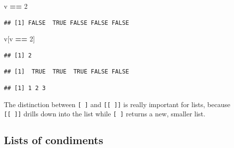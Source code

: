 \documentclass[
]{book}
\newenvironment{Shaded}{\begin{snugshade}}{\end{snugshade}}
\newcommand{\DecValTok}[1]{\textcolor[rgb]{0.00,0.00,0.81}{#1}}
\newcommand{\NormalTok}[1]{#1}
\newcommand{\OperatorTok}[1]{\textcolor[rgb]{0.81,0.36,0.00}{\textbf{#1}}}
\newcommand{\StringTok}[1]{\textcolor[rgb]{0.31,0.60,0.02}{#1}}
\begin{document}
\begin{Shaded}
\begin{Highlighting}[]
\NormalTok{v }\OperatorTok{==}\StringTok{ }\DecValTok{2}
\end{Highlighting}
\end{Shaded}

\begin{verbatim}
## [1] FALSE  TRUE FALSE FALSE FALSE
\end{verbatim}

\begin{Shaded}
\begin{Highlighting}[]
\NormalTok{v[v }\OperatorTok{==}\StringTok{ }\DecValTok{2}\NormalTok{]}
\end{Highlighting}
\end{Shaded}

\begin{verbatim}
## [1] 2
\end{verbatim}

\begin{Shaded}
\end{Shaded}

\begin{verbatim}
## [1]  TRUE  TRUE  TRUE FALSE FALSE
\end{verbatim}

\begin{Shaded}
\end{Shaded}

\begin{verbatim}
## [1] 1 2 3
\end{verbatim}

The distinction between \texttt{{[}\ {]}} and \texttt{{[}{[}\ {]}{]}} is really important for lists, because \texttt{{[}{[}\ {]}{]}} drills down into the list while \texttt{{[}\ {]}} returns a new, smaller list.

\hypertarget{lists-of-condiments}{%
\subsection{Lists of condiments}\label{lists-of-condiments}}
\end{document}

